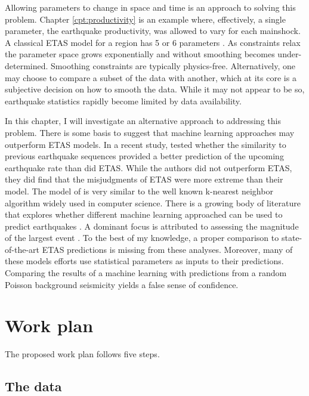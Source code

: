 \documentclass[12pt, notitlepage]{report}
\begin{document}
Allowing parameters to change in space and time is an approach to solving this problem. Chapter \ref{cpt:productivity} is an example where, effectively, a single parameter, the earthquake productivity, was allowed to vary for each mainshock. A classical ETAS model for a region has 5 or 6 parameters \cite{Ogata1988}. As constraints relax the parameter space grows exponentially and without smoothing becomes under-determined. Smoothing constraints are typically physics-free. Alternatively, one may choose to compare a subset of the data with another, which at its core is a subjective decision on how to smooth the data. While it may not appear to be so, earthquake statistics rapidly become limited by data availability.

In this chapter, I will investigate an alternative approach to addressing this problem. There is some basis to suggest that machine learning approaches may outperform ETAS models. In a recent study, \textcite{VanderElst2017} tested whether the similarity to previous earthquake sequences provided a better prediction of the upcoming earthquake rate than did ETAS. While the authors did not outperform ETAS, they did find that the misjudgments of ETAS were more extreme than their model. The model of \textcite{VanderElst2017} is very similar to the well known k-nearest neighbor algorithm widely used in computer science. There is a growing body of literature that explores whether different machine learning approached can be used to predict earthquakes \cite{Last2016PredictingCountries, Adeli2009, Panakkat2007, Reyes2013, Asencio-Cortes2017, Geller1997EarthquakeReview, Morales-Esteban2010PatternSeries}. A dominant focus is attributed to assessing the magnitude of the largest event \cite{Last2016PredictingCountries,Panakkat2007,Adeli2009}. To the best of my knowledge, a proper comparison to state-of-the-art ETAS predictions is missing from these analyses. Moreover, many of these models efforts use statistical parameters as inputs to their predictions. Comparing the results of a machine learning with predictions from a random Poisson background seismicity yields a false sense of confidence. 



\section{Work plan}
The proposed work plan follows five steps. 

\subsection{The data}
\end{document}
